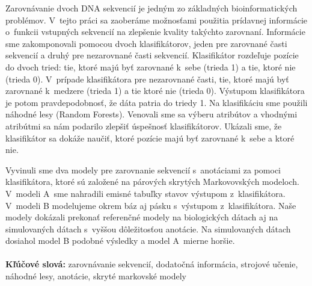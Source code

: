 Zarovnávanie dvoch DNA sekvencií je jedným zo základných
bioinformatických problémov. V~tejto práci sa zaoberáme možnosťami použitia prídavnej informácie o~funkcii vstupných sekvencií na zlepšenie kvality takýchto zarovnaní.
Informácie sme zakomponovali pomocou dvoch klasifikátorov, jeden pre zarovnané časti sekvencií a druhý pre nezarovnané časti sekvencií.
Klasifikátor rozdeľuje pozície do dvoch tried: tie, ktoré majú byť zarovnané k~sebe (trieda 1) a tie, ktoré nie (trieda 0). V~prípade klasifikátora pre nezarovnané časti, tie, ktoré majú byť zarovnané k~medzere (trieda 1) a tie ktoré nie (trieda 0). Výstupom klasifikátora je potom pravdepodobnosť, že dáta patria do triedy 1. Na klasifikáciu sme použili náhodné lesy (Random Forests). Venovali sme sa výberu atribútov a vhodnými atribútmi sa nám podarilo zlepšiť úspešnosť klasifikátorov. Ukázali sme, že klasifikátor sa dokáže naučiť, ktoré pozície majú byť zarovnané k~sebe a ktoré nie.

Vyvinuli sme dva modely pre zarovnanie sekvencií s~anotáciami za pomoci klasifikátora, ktoré sú založené na párových skrytých Markovovských modeloch.
V~modeli A~sme nahradili emisné tabuľky stavov výstupom z~klasifikátora.
V~modeli B modelujeme okrem báz aj pásku s~výstupom z~klasifikátora.
Naše modely dokázali prekonať referenčné modely na biologických dátach aj na simulovaných dátach s~vyššou dôležitosťou anotácie. Na simulovaných dátach dosiahol model B podobné výsledky a model A~mierne horšie.
\\ \\
{\bf Kľúčové slová:} zarovnávanie sekvencií, dodatočná informácia, strojové učenie, náhodné lesy, anotácie, skryté markovské modely
